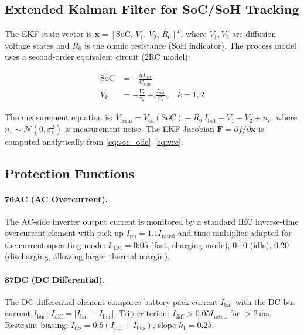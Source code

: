 \documentclass[11pt, a4paper]{article}
\newcommand{\ms}{\,\text{ms}}
\begin{document}
\subsection{Extended Kalman Filter for SoC/SoH Tracking}

The EKF state vector is $\mathbf{x} = [\mathrm{SoC},\, V_1,\, V_2,\, R_0]^T$,
where $V_1, V_2$ are diffusion voltage states and $R_0$ is the ohmic resistance
(SoH indicator). The process model uses a second-order equivalent circuit
(2RC model):

\begin{align}
  \dot{\mathrm{SoC}} &= -\frac{\eta\,I_{\mathrm{bat}}}{C_{\mathrm{nom}}}
  \label{eq:soc_ode}\\
  \dot{V}_k &= -\frac{V_k}{\tau_k} + \frac{I_{\mathrm{bat}}}{C_k},
  \quad k = 1, 2
  \label{eq:vrc}
\end{align}

\noindent The measurement equation is:
$V_{\mathrm{term}} = V_{\mathrm{oc}}(\mathrm{SoC}) - R_0\,I_{\mathrm{bat}}
- V_1 - V_2 + n_v$,
where $n_v \sim \mathcal{N}(0, \sigma_v^2)$ is measurement noise.
The EKF Jacobian $\mathbf{F} = \partial f / \partial \mathbf{x}$ is computed
analytically from \eqref{eq:soc_ode}--\eqref{eq:vrc}.

\subsection{Protection Functions}

\paragraph{76AC (AC Overcurrent).}
The AC-side inverter output current is monitored by a standard IEC inverse-time
overcurrent element with pick-up $I_{\mathrm{pu}} = 1.1 I_{\mathrm{rated}}$
and time multiplier adapted for the current operating mode:
$k_{\mathrm{TM}} = 0.05$ (fast, charging mode), $0.10$ (idle), $0.20$
(discharging, allowing larger thermal margin).

\paragraph{87DC (DC Differential).}
The DC differential element compares battery pack current $I_{\mathrm{bat}}$
with the DC bus current $I_{\mathrm{bus}}$:
$I_{\mathrm{diff}} = |I_{\mathrm{bat}} - I_{\mathrm{bus}}|$.
Trip criterion: $I_{\mathrm{diff}} > 0.05 I_{\mathrm{rated}}$ for $> 2\ms$.
Restraint biasing: $I_{\mathrm{res}} = 0.5(I_{\mathrm{bat}} + I_{\mathrm{bus}})$,
slope $k_1 = 0.25$.
\end{document}
